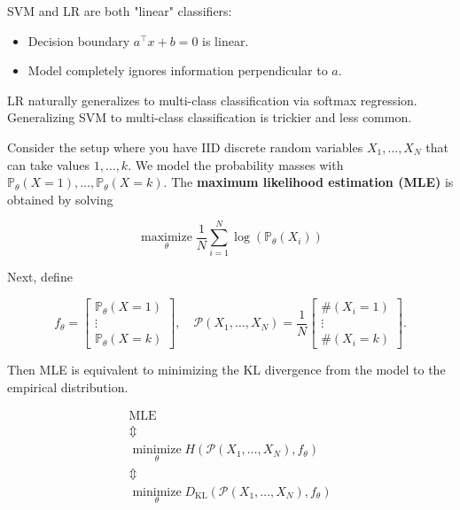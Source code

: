 \documentclass{report}
\begin{document}
\begin{concept}[3.15][SVM vs LR]
    SVM and LR are both "linear" classifiers:

    \begin{itemize}
        \item Decision boundary $a^{\top} x+b=0$ is linear.
        \item Model completely ignores information perpendicular to $a$.
    \end{itemize}

    LR naturally generalizes to multi-class classification via softmax regression. Generalizing SVM to multi-class classification is trickier and less common.
\end{concept}

\begin{concept}
    Consider the setup where you have IID discrete random variables $X_{1}, \ldots, X_{N}$ that can take values $1, \ldots, k$. We model the probability masses with $\mathbb{P}_{\theta}(X=1), \ldots, \mathbb{P}_{\theta}(X=k)$. The \textbf{maximum likelihood estimation (MLE)} is obtained by solving

    $$
    \underset{\theta}{\operatorname{maximize}} \frac{1}{N} \sum_{i=1}^{N} \log \left(\mathbb{P}_{\theta}\left(X_{i}\right)\right)
    $$

    Next, define

    $$
    f_{\theta}=\left[\begin{array}{c}
    \mathbb{P}_{\theta}(X=1) \\
    \vdots \\
    \mathbb{P}_{\theta}(X=k)
    \end{array}\right], \quad \mathcal{P}\left(X_{1}, \ldots, X_{N}\right)=\frac{1}{N}\left[\begin{array}{c}
    \#\left(X_{i}=1\right) \\
    \vdots \\
    \#\left(X_{i}=k\right)
    \end{array}\right] .
    $$

    Then MLE is equivalent to minimizing the KL divergence from the model to the empirical distribution.

    $$
    \begin{gathered}
    \text{MLE} \\
    \mathbb{\Updownarrow} \\
    \underset{\theta}{\operatorname{minimize}} H \left( \mathcal{P}\left(X_{1}, \ldots, X_{N}\right), f_{\theta}\right) \\
    \mathbb{\Updownarrow} \\
    \underset{\theta}{\operatorname{minimize}} D_{\mathrm{KL}} \left( \mathcal{P}\left(X_{1}, \ldots, X_{N}\right), f_{\theta}\right) \\
    \end{gathered}
    $$


\end{concept}
\end{document}
